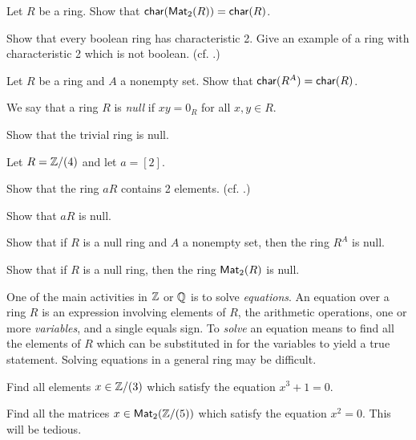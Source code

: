 \begin{exercise}
Let \(R\) be a ring.
Show that \(\mathsf{char}(\mathsf{Mat}_{2}(R)) = \mathsf{char}(R)\).
\end{exercise}

\begin{exercise}
Show that every boolean ring has characteristic 2.
Give an example of a ring with characteristic 2 which is not boolean.
(cf. .)
\end{exercise}

\begin{exercise}
Let \(R\) be a ring and \(A\) a nonempty set.
Show that \(\mathsf{char}(R^A) = \mathsf{char}(R)\).
\end{exercise}

\begin{dfn} \label{dfn:null-ring}
We say that a ring \(R\) is \emph{null} if \(xy = 0_R\) for all \(x,y \in R\).
\end{dfn}

\begin{exercise}
Show that the trivial ring is null.
\end{exercise}


\begin{exercise}
Let \(R = \mathbb{Z}/(4)\) and let \(a = [2]\).
\begin{proplist*}
\item Show that the ring \(aR\) contains 2 elements.
(cf. .)
\item Show that \(aR\) is null.
\end{proplist*}
\end{exercise}


\begin{exercise}
Show that if \(R\) is a null ring and \(A\) a nonempty set, then the ring \(R^A\) is null.
\end{exercise}


\begin{exercise}
Show that if \(R\) is a null ring, then the ring \(\mathsf{Mat}_{2}(R)\) is null.
\end{exercise}


One of the main activities in \(\mathbb{Z}\) or \(\mathbb{Q}\) is to solve \emph{equations}.
An equation over a ring \(R\) is an expression involving elements of \(R\), the arithmetic operations, one or more \emph{variables}, and a single equals sign.
To \emph{solve} an equation means to find all the elements of \(R\) which can be substituted in for the variables to yield a true statement.
Solving equations in a general ring may be difficult. \medskip


\begin{exercise}
Find all elements \(x \in \mathbb{Z}/(3)\) which satisfy the equation \(x^3 + 1 = 0\).
\end{exercise}


\begin{exercise}
Find all the matrices \(x \in \mathsf{Mat}_{2}(\mathbb{Z}/(5))\) which satisfy the equation \(x^2 = 0\).
This will be tedious.
\end{exercise}
